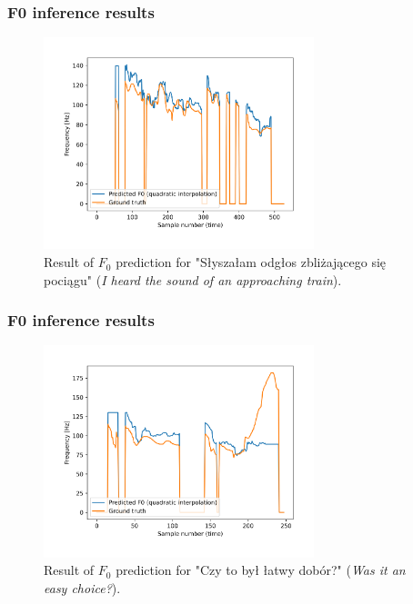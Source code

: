 \documentclass[a4paper,9pt]{beamer}
\theoremstyle{mytheoremstyle}
\begin{document}
\begin{frame}
\frametitle{F0 inference results}
\begin{figure}
\begin{center}
  \includegraphics[width=0.7\textwidth]{res/amu_pl_ilo_BAZA_2006A_zbitki_A0036_simple_pred_freq}
\end{center}
	\caption{Result of $F_0$ prediction for "S\l{}ysza\l{}am odg\l{}os zbli\.zaj\k{a}cego si\k{e} poci\k{a}gu" (\textit{I heard the sound of an approaching train}).}
\end{figure}
\end{frame}

\begin{frame}
\frametitle{F0 inference results}
\begin{figure}
\begin{center}
  \includegraphics[width=0.7\textwidth]{res/amu_pl_ilo_BAZA_2006C_C0160_simple_pred_freq}
\end{center}
	\caption{Result of $F_0$ prediction for "Czy to by\l{} \l{}atwy dob\'or?" (\textit{Was it an easy choice?}).}
\end{figure}
\end{frame}
\end{document}
